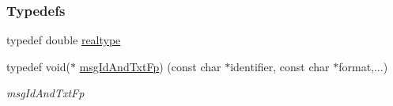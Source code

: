 \subsubsection*{Typedefs}
\begin{DoxyCompactItemize}
\item 
typedef double \mbox{\hyperlink{namespaceamici_a1bdce28051d6a53868f7ccbf5f2c14a3}{realtype}}
\item 
typedef void($\ast$ \mbox{\hyperlink{namespaceamici_a02384ab9af881494db3ed32cd6ecdcc0}{msg\+Id\+And\+Txt\+Fp}}) (const char $\ast$identifier, const char $\ast$format,...)
\begin{DoxyCompactList}\small\item\em msg\+Id\+And\+Txt\+Fp \end{DoxyCompactList}\end{DoxyCompactItemize}
